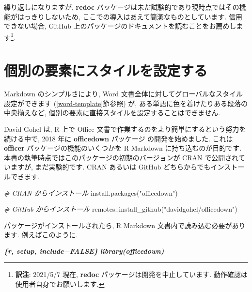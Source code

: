 \documentclass[
  11pt,
  lualatex,ja=standard,jafont=noto]{bxjsreport}
\newenvironment{Shaded}{\begin{snugshade}}{\end{snugshade}}
\newcommand{\CommentTok}[1]{\textcolor[rgb]{0.56,0.35,0.01}{\textit{#1}}}
\newcommand{\FunctionTok}[1]{\textcolor[rgb]{0.00,0.00,0.00}{#1}}
\newcommand{\InformationTok}[1]{\textcolor[rgb]{0.56,0.35,0.01}{\textbf{\textit{#1}}}}
\newcommand{\NormalTok}[1]{#1}
\newcommand{\SpecialCharTok}[1]{\textcolor[rgb]{0.00,0.00,0.00}{#1}}
\newcommand{\StringTok}[1]{\textcolor[rgb]{0.31,0.60,0.02}{#1}}
\begin{document}
繰り返しになりますが, \textbf{redoc} パッケージは未だ試験的であり現時点ではその機能がはっきりしないため, ここでの導入はあえて簡潔なものとしています. 信用できない場合, GitHub 上のパッケージのドキュメントを読むことをお薦めします\footnote{\textbf{訳注}: 2021/5/7 現在, \textbf{redoc} パッケージは開発を中止しています. 動作確認は使用者自身でお願いします.}.

\hypertarget{word-officedown}{%
\section{個別の要素にスタイルを設定する}\label{word-officedown}}

Markdown のシンプルさにより, Word 文書全体に対してグローバルなスタイル設定ができます (\ref{word-template}節参照) が, ある単語に色を着けたりある段落の中央揃えなど, 個別の要素に直接スタイルを設定することはできません.

David Gohel は, R 上で Office 文書で作業するのをより簡単にするという努力を続ける中で, 2018 年に \textbf{officedown} パッケージ \autocite{R-officedown}の開発を始めました. これは \textbf{officer} \autocite{R-officer} パッケージの機能のいくつかを R Markdown に持ち込むのが目的です. 本書の執筆時点ではこのパッケージの初期のバージョンが CRAN で公開されていますが, まだ実験的です. CRAN あるいは GitHub どちらからでもインストールできます.

\begin{Shaded}
\begin{Highlighting}[]
\CommentTok{\# CRAN からインストール}
\FunctionTok{install.packages}\NormalTok{(}\StringTok{"officedown"}\NormalTok{)}

\CommentTok{\# GitHub からインストール}
\NormalTok{remotes}\SpecialCharTok{::}\FunctionTok{install\_github}\NormalTok{(}\StringTok{"davidgohel/officedown"}\NormalTok{)}
\end{Highlighting}
\end{Shaded}

パッケージがインストールされたら, R Markdown 文書内で読み込む必要があります. 例えばこのように.

\begin{Shaded}
\begin{Highlighting}[]
\InformationTok{\textasciigrave{}\textasciigrave{}\textasciigrave{}\{r, setup, include=FALSE\}}
\InformationTok{library(officedown)}
\InformationTok{\textasciigrave{}\textasciigrave{}\textasciigrave{}}
\end{Highlighting}
\end{Shaded}
\end{document}
